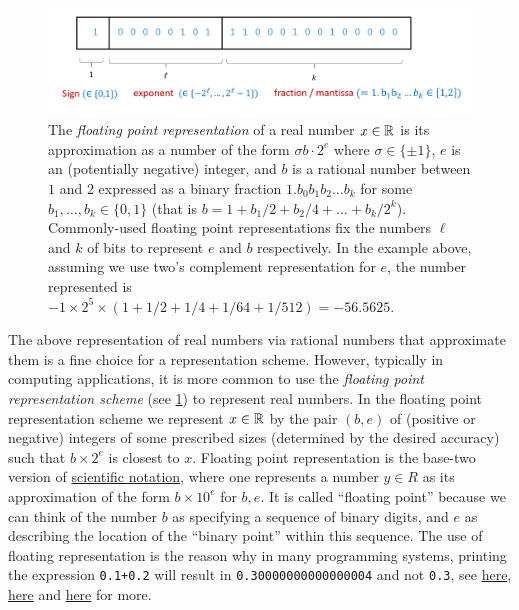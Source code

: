 \begin{figure}
\centering
\includegraphics[width=\textwidth, height=0.25\paperheight, keepaspectratio]{../figure/floatingpoint.png}
\caption{The \emph{floating point representation} of a real number
\(x\in {\mathbb{R}}\) is its approximation as a number of the form
\(\sigma b \cdot 2^e\) where \(\sigma \in \{\pm 1 \}\), \(e\) is an
(potentially negative) integer, and \(b\) is a rational number between
\(1\) and \(2\) expressed as a binary fraction
\(1.b_0b_1b_2\ldots b_{k}\) for some \(b_1,\ldots,b_k \in \{0,1\}\)
(that is \(b = 1 + b_1/2 + b_2/4 + \ldots + b_k/2^k\)). Commonly-used
floating point representations fix the numbers \(\ell\) and \(k\) of
bits to represent \(e\) and \(b\) respectively. In the example above,
assuming we use two's complement representation for \(e\), the number
represented is
\(-1 \times 2^{5} \times ( 1 + 1/2 + 1/4 + 1/64 + 1/512) = -56.5625\).}
\label{floatingpointfig}
\end{figure}

The above representation of real numbers via rational numbers that
approximate them is a fine choice for a representation scheme. However,
typically in computing applications, it is more common to use the
\emph{floating point representation scheme} (see
\cref{floatingpointfig}) to represent real numbers. In the floating
point representation scheme we represent \(x\in {\mathbb{R}}\) by the pair
\((b,e)\) of (positive or negative) integers of some prescribed sizes
(determined by the desired accuracy) such that \(b \times 2^{e}\) is
closest to \(x\). Floating point representation is the base-two version
of \href{https://goo.gl/MUJnVE}{scientific notation}, where one
represents a number \(y\in R\) as its approximation of the form
\(b \times 10^e\) for \(b,e\). It is called ``floating point'' because
we can think of the number \(b\) as specifying a sequence of binary
digits, and \(e\) as describing the location of the ``binary point''
within this sequence. The use of floating representation is the reason
why in many programming systems, printing the expression
\texttt{0.1+0.2} will result in \texttt{0.30000000000000004} and not
\texttt{0.3}, see \href{http://floating-point-gui.de/}{here},
\href{https://docs.oracle.com/cd/E19957-01/806-3568/ncg_goldberg.html}{here}
and
\href{https://randomascii.wordpress.com/2012/04/05/floating-point-complexities/}{here}
for more.


